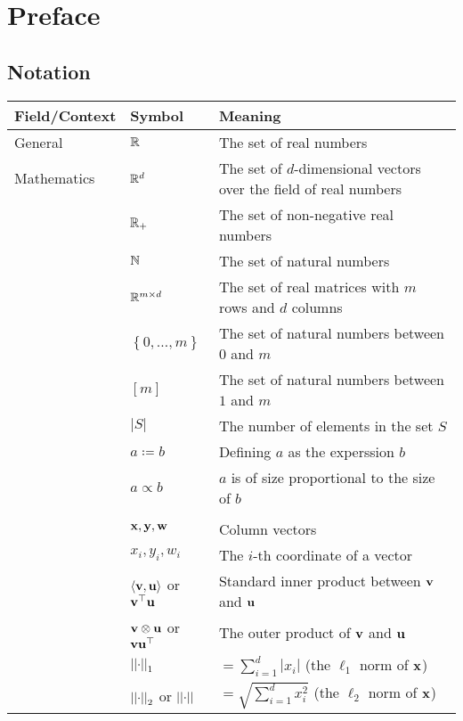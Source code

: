 \section{Preface}


\subsection{Notation}

\begin{table}[h!]
	\begin{center}
		\label{tab:notation}
		
		\begin{tabular}{l|l|l}
			\textbf{Field/Context} & \textbf{Symbol} & \textbf{Meaning} \\
			\hline
			General&$\mathbb{R}$ & The set of real numbers\\
			Mathematics&$\mathbb{R}^d$ & The set of $d$-dimensional vectors over the field of real numbers\\
			&$\mathbb{R}_+$ & The set of non-negative real numbers\\
			&$\mathbb{N}$ & The set of natural numbers\\
			&$\mathbb{R}^{m\times d}$ & The set of real matrices with $m$ rows and $d$ columns\\
			&$\left\{0,\ldots,m\right\}$ & The set of natural numbers between $0$ and $m$\\
			&$\left[m\right]$ & The set of natural numbers between $1$ and $m$\\
			&$\left|S\right|$& The number of elements in the set $S$\\
			&$a\coloneqq b$& Defining $a$ as the experssion $b$\\
			&$a\propto b$& $a$ is of size proportional to the size of $b$\\
			&&\\	
			&$\mathbf{x},\mathbf{y},\mathbf{w}$ & Column vectors\\
			&$x_i,y_i,w_i$ & The $i$-th coordinate of a vector\\
			&$\left\langle \mathbf{v},\mathbf{u}\right\rangle$ or $\mathbf{v}^\top \mathbf{u}$ & Standard inner product between $\mathbf{v}$ and $\mathbf{u}$\\
			&$\mathbf{v}\otimes \mathbf{u}$ or $\mathbf{v}\mathbf{u}^\top$ & The outer product of $\mathbf{v}$ and $\mathbf{u}$\\
			&$\left|\left| \cdot\right|\right|_1$& $=\sum_{i=1}^d\left| x_i\right|$ (the $\ell_1$ norm of $\mathbf{x}$)\\ 
			&$\left|\left| \cdot\right|\right|_2$ or $\left|\left| \cdot\right|\right|$& $=\sqrt{\sum_{i=1}^d x_i^2}$ (the $\ell_2$ norm of $\mathbf{x}$)\\

\end{tabular}
\end{center}
\end{table}
